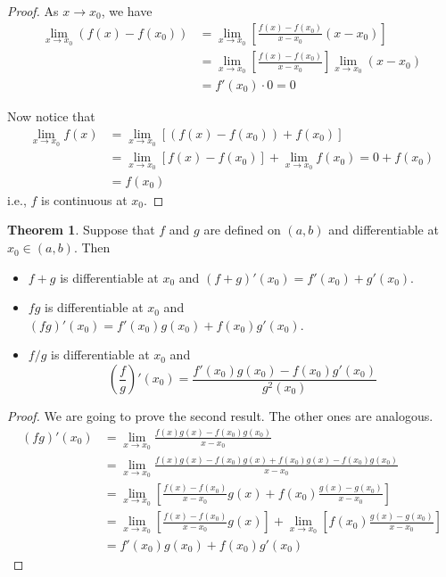 \documentclass[12pt,a4paper]{article}
\theoremstyle{definition}
\newtheorem{theorem}{Theorem}[section]
\begin{document}
\begin{proof}
	As $x \to x_0$, we have
	\begin{equation*}
		\begin{aligned}
			\lim_{x \to x_0} (f(x) - f(x_0)) &= \lim_{x \to x_0} \left[ \frac{f(x) - f(x_0)}{x - x_0} (x - x_0) \right] \\
			&= \lim_{x \to x_0} \left[ \frac{f(x) - f(x_0)}{x - x_0} \right] \lim_{x \to x_0} (x - x_0) \\
			&= f'(x_0) \cdot 0 = 0
		\end{aligned}
	\end{equation*}

	Now notice that
	\begin{equation*}
	\begin{aligned}
			\lim_{x \to x_0} f(x) &= \lim_{x \to x_0} [(f(x) - f(x_0)) + f(x_0)] \\
			&= \lim_{x \to x_0} [f(x) - f(x_0)] + \lim_{x \to x_0} f(x_0) = 0 + f(x_0) \\
			&= f(x_0)
		\end{aligned}
	\end{equation*}
	i.e., $f$ is continuous at $x_0$.
\end{proof}

\begin{theorem}
	Suppose that $f$ and $g$ are defined on $(a,b)$ and differentiable at $x_0 \in (a,b)$. Then
	\begin{itemize}
		\item $f+g$ is differentiable at $x_0$ and $(f+g)'(x_0) = f'(x_0)+g'(x_0)$.
		\item $fg$ is differentiable at $x_0$ and $(fg)'(x_0) = f'(x_0)g(x_0) + f(x_0)g'(x_0)$.
		\item $f/g$ is differentiable at $x_0$ and
		\[
			\left( \frac{f}{g} \right)'(x_0) = \frac{f'(x_0)g(x_0) - f(x_0)g'(x_0)}{g^2(x_0)}
		\]
	\end{itemize}
\end{theorem}

\begin{proof}
	We are going to prove the second result. The other ones are analogous.
	\begin{equation*}
		\begin{aligned}
			(fg)'(x_0) &= \lim_{x \to x_0} \frac{f(x)g(x) - f(x_0)g(x_0)}{x-x_0} \\
			&= \lim_{x \to x_0} \frac{f(x)g(x) - f(x_0)g(x) + f(x_0)g(x) - f(x_0)g(x_0)}{x-x_0} \\
			&= \lim_{x \to x_0} \left[ \frac{f(x) - f(x_0)}{x-x_0} g(x) + f(x_0) \frac{g(x) - g(x_0)}{x-x_0}  \right] \\
			&= \lim_{x \to x_0} \left[ \frac{f(x) - f(x_0)}{x-x_0} g(x) \right] + \lim_{x \to x_0} \left[ f(x_0) \frac{g(x) - g(x_0)}{x-x_0}  \right] \\
			&= f'(x_0) g(x_0) + f(x_0)g'(x_0)
		\end{aligned}
	\end{equation*}
\end{proof}
\end{document}
